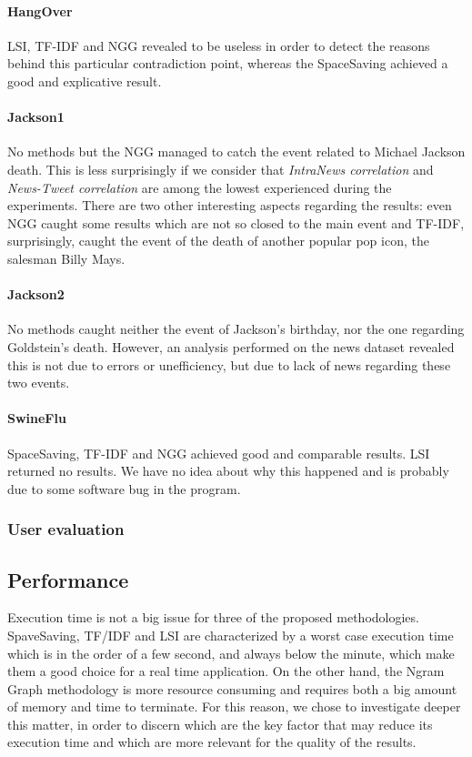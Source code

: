 \paragraph*{HangOver}
LSI, TF-IDF and NGG revealed to be useless in order to detect the reasons behind
this particular contradiction point, whereas the SpaceSaving achieved a good and
explicative result.

\paragraph*{Jackson1}
No methods but the NGG managed to catch the event related to
Michael Jackson death. This is less surprisingly if we consider that
\emph{IntraNews correlation} and \emph{News-Tweet correlation} are among the
lowest experienced during the experiments.
There are two other interesting aspects regarding the
results: even NGG caught some results which are not so closed to the main event
and TF-IDF, surprisingly, caught the event of the death of another popular pop
icon, the salesman Billy Mays.

\paragraph*{Jackson2}
No methods caught neither the event of Jackson's birthday, nor the one regarding
Goldstein's death. However, an analysis performed on the news dataset revealed
this is not due to errors or unefficiency, but due to lack of news regarding
these two events.

\paragraph*{SwineFlu}
SpaceSaving, TF-IDF and NGG achieved good and comparable results. LSI returned
no results. We have no idea about why this happened and is probably due to some
software bug in the program.

\subsubsection*{User evaluation}


\subsection*{Performance}
Execution time is not a big issue for three of the proposed methodologies.
SpaveSaving, TF/IDF and LSI are characterized by a worst case execution time
which is in the order of a few second, and always below the minute, which make
them a good choice for a real time application. On the other hand, the Ngram
Graph methodology is more resource consuming and requires both a big amount of
memory and time to terminate. For this reason, we chose to investigate deeper
this matter, in order to discern which are the key factor that may reduce its
execution time and which are more relevant for the quality of the results. 
 
